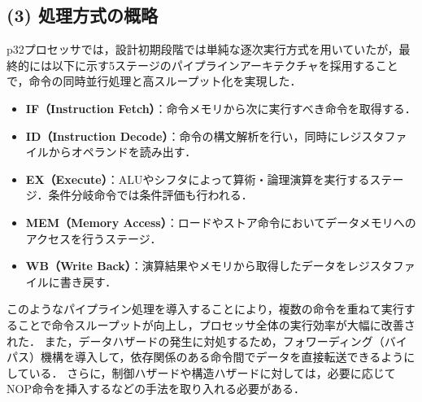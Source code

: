 \documentclass[autodetect-engine,dvi=dvipdfmx,ja=standard,
               a4j,11pt]{bxjsarticle}
\begin{document}
\subsection*{(3) 処理方式の概略}
p32プロセッサでは，設計初期段階では単純な逐次実行方式を用いていたが，最終的には以下に示す5ステージのパイプラインアーキテクチャを採用することで，命令の同時並行処理と高スループット化を実現した．

\begin{itemize}
\item \textbf{IF（Instruction Fetch）}：命令メモリから次に実行すべき命令を取得する．
\item \textbf{ID（Instruction Decode）}：命令の構文解析を行い，同時にレジスタファイルからオペランドを読み出す．
\item \textbf{EX（Execute）}：ALUやシフタによって算術・論理演算を実行するステージ．条件分岐命令では条件評価も行われる．
\item \textbf{MEM（Memory Access）}：ロードやストア命令においてデータメモリへのアクセスを行うステージ．
\item \textbf{WB（Write Back）}：演算結果やメモリから取得したデータをレジスタファイルに書き戻す．
\end{itemize}

このようなパイプライン処理を導入することにより，複数の命令を重ねて実行することで命令スループットが向上し，プロセッサ全体の実行効率が大幅に改善された．
また，データハザードの発生に対処するため，フォワーディング（バイパス）機構を導入して，依存関係のある命令間でデータを直接転送できるようにしている．
さらに，制御ハザードや構造ハザードに対しては，必要に応じてNOP命令を挿入するなどの手法を取り入れる必要がある．
\end{document}
